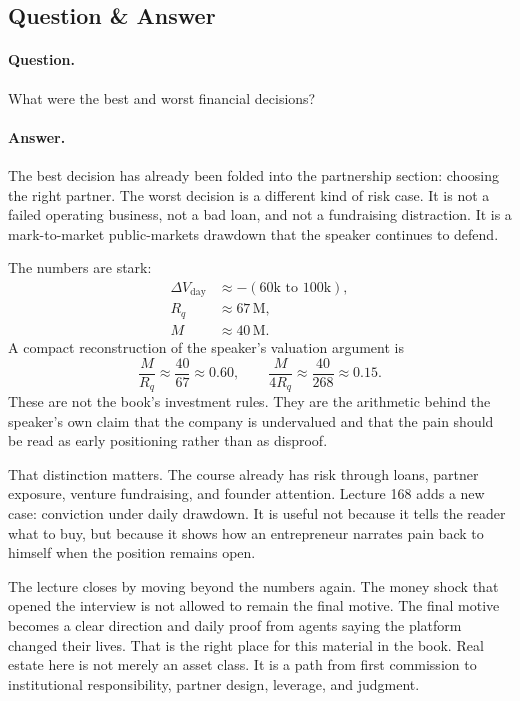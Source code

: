 \documentclass[11pt,oneside]{book}
\begin{document}
\subsection{Question \& Answer}

\paragraph{Question.}
What were the best and worst financial decisions?

\paragraph{Answer.}
The best decision has already been folded into the partnership section: choosing the right partner. The worst decision is a different kind of risk case. It is not a failed operating business, not a bad loan, and not a fundraising distraction. It is a mark-to-market public-markets drawdown that the speaker continues to defend.

The numbers are stark:
\begin{align}
\Delta V_{\mathrm{day}} &\approx -(60\text{k to }100\text{k}),\\
R_q &\approx 67\,\mathrm{M},\\
M &\approx 40\,\mathrm{M}.
\end{align}
A compact reconstruction of the speaker's valuation argument is
\begin{equation}
\frac{M}{R_q} \approx \frac{40}{67} \approx 0.60,
\qquad
\frac{M}{4R_q} \approx \frac{40}{268} \approx 0.15.
\end{equation}
These are not the book's investment rules. They are the arithmetic behind the speaker's own claim that the company is undervalued and that the pain should be read as early positioning rather than as disproof.

That distinction matters. The course already has risk through loans, partner exposure, venture fundraising, and founder attention. Lecture 168 adds a new case: conviction under daily drawdown. It is useful not because it tells the reader what to buy, but because it shows how an entrepreneur narrates pain back to himself when the position remains open.

The lecture closes by moving beyond the numbers again. The money shock that opened the interview is not allowed to remain the final motive. The final motive becomes a clear direction and daily proof from agents saying the platform changed their lives. That is the right place for this material in the book. Real estate here is not merely an asset class. It is a path from first commission to institutional responsibility, partner design, leverage, and judgment.
\end{document}
